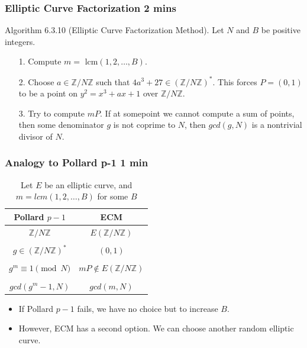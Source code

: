 \documentclass{beamer}
\begin{document}
\begin{frame}
\frametitle{Elliptic Curve Factorization 2 mins}
Algorithm 6.3.10 (Elliptic Curve Factorization Method). Let $N$ and $B$ be positive integers.
\begin{itemize}
\item[1.] Compute $m =$ lcm$(1,2,\ldots, B)$.
\item[2.] Choose $a \in \mathbb{Z}/N\mathbb{Z}$ such that $4a^3 + 27 \in \left(\mathbb{Z}/N\mathbb{Z}\right)^*$. This forces $P = (0,1)$ to be a point on $y^2 = x^3 + ax +1$ over $\mathbb{Z}/N\mathbb{Z}$.
\item[3.] Try to compute $mP$. If at somepoint we cannot compute a sum of points, then some denominator $g$ is not coprime to $N$, then $gcd(g,N)$ is a nontrivial divisor of $N$.
\end{itemize}
\end{frame}

\begin{frame}
\frametitle{Analogy to Pollard p-1 1 min}
\begin{table}[h!]
  \begin{center}
    \caption{Let $E$ be an elliptic curve, and $m = lcm(1,2,\ldots,B)$ for some $B$}
    \label{tab:table1}
    \begin{tabular}{|c|c|} %
      \textbf{Pollard $p-1$} & \textbf{ECM} \\
      \hline
      $\mathbb{Z}/N\mathbb{Z}$ & $E\left( \mathbb{Z}/N\mathbb{Z} \right)$\\ &\\
      $g \in (\mathbb{Z}/N\mathbb{Z})^*$ & $(0,1)$ \\ & \\
      $g^m \equiv 1 \pmod{N}$ & $mP \notin E\left( \mathbb{Z}/N\mathbb{Z} \right)$ \\ &\\
      $gcd(g^m-1, N)$ & $gcd(m,N)$
    \end{tabular}
  \end{center}
\end{table}

\begin{itemize}
\item If Pollard $p-1$ fails, we have no choice but to increase $B$.
\item However, ECM has a second option. We can choose another random elliptic curve.
\end{itemize}
\end{frame}
\end{document}
